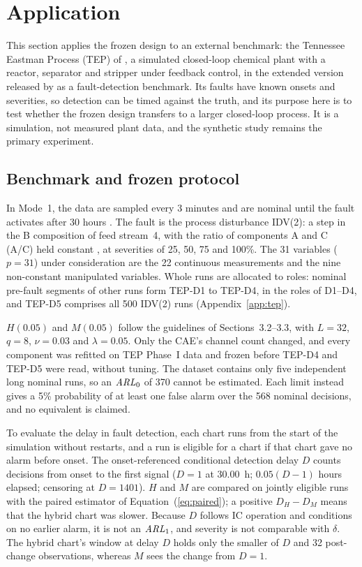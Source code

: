 \section{Application}
\label{sec:application}

This section applies the frozen design to an external benchmark: the Tennessee Eastman Process (TEP)
of \citet{downs_plant_wide_1993}, a simulated closed-loop chemical plant with a reactor, separator and stripper under feedback control, in the extended version released by \citet{reinartz_extended_2021} as a fault-detection benchmark. Its faults have known onsets and severities, so detection can be timed against the truth, and its purpose here is to test whether the frozen design transfers to a larger closed-loop process. It is a simulation, not measured plant data, and the synthetic study remains the primary experiment.

\subsection{Benchmark and frozen protocol}

In Mode~1, the data are sampled every 3 minutes and are nominal until the fault activates after
30 hours \citep{reinartz_tennessee_2021}. The fault is the process disturbance IDV(2): a step in the
B composition of feed stream~4, with the ratio of components A and C (A/C) held
constant \citep{reinartz_extended_2021}, at severities of 25, 50, 75 and 100\%. The 31 variables
($p=31$) under consideration are the 22
continuous measurements and the nine non-constant manipulated variables. Whole runs are allocated to
roles: nominal pre-fault segments of other runs form TEP-D1 to TEP-D4, in the roles of D1--D4, and
TEP-D5 comprises all 500 IDV(2) runs (Appendix~\ref{app:tep}).

$H(0.05)$ and $M(0.05)$ follow the guidelines of Sections~3.2--3.3, with $L=32$,
$q=8$, $\nu=0.03$ and $\lambda=0.05$. Only the CAE's channel count changed, and every component was
refitted on TEP Phase~I data and frozen before TEP-D4 and TEP-D5 were read, without tuning. The
dataset contains only five independent long nominal runs, so an $\mathit{ARL}_0$ of 370 cannot be estimated.
Each limit instead gives a 5\% probability of at least one false alarm over the 568 nominal
decisions, and no \ARL{} equivalent is claimed.

To evaluate the delay in fault detection, each chart runs from the start of the simulation without restarts, and a run is
eligible for a chart if that chart gave no alarm before onset. The onset-referenced conditional
detection delay $D$ counts decisions from onset to the first signal ($D=1$ at 30.00~h; $0.05(D-1)$ hours
elapsed; censoring at $D=1401$). $H$ and $M$ are compared on jointly eligible runs with the paired
estimator of Equation~(\ref{eq:paired}); a positive $D_H-D_M$ means that the hybrid chart was slower.
Because $D$ follows IC operation and conditions on no earlier alarm, it is not an $\mathit{ARL}_1$,
and severity is not comparable with $\delta$. The hybrid chart's window at delay $D$ holds only
the smaller of $D$ and 32 post-change observations, whereas $M$ sees the change from $D=1$.

